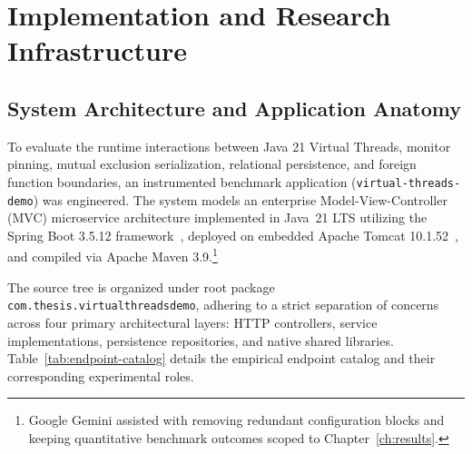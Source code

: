 \chapter{Implementation and Research Infrastructure}
\label{ch:artifact}

\section{System Architecture and Application Anatomy}
\label{sec:system-architecture}

To evaluate the runtime interactions between Java 21 Virtual Threads, monitor pinning, mutual exclusion serialization, relational persistence, and foreign function boundaries, an instrumented benchmark application (\texttt{virtual-threads-demo}) was engineered. The system models an enterprise Model-View-Controller (MVC) microservice architecture implemented in Java~21 LTS utilizing the Spring Boot 3.5.12 framework~\cite{SpringReference}, deployed on embedded Apache Tomcat 10.1.52~\cite{TomcatReference}, and compiled via Apache Maven 3.9.\footnote{Google Gemini assisted with removing redundant configuration blocks and keeping quantitative benchmark outcomes scoped to Chapter~\ref{ch:results}.}

The source tree is organized under root package \texttt{com.\allowbreak thesis.\allowbreak virtual\allowbreak threadsdemo}, adhering to a strict separation of concerns across four primary architectural layers: HTTP controllers, service implementations, persistence repositories, and native shared libraries. Table~\ref{tab:endpoint-catalog} details the empirical endpoint catalog and their corresponding experimental roles.

